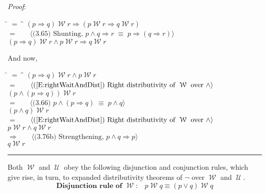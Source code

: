 \documentclass[12pt, fleqn, leqno]{article}
\newcommand{\lgap}{2pt}                             %
\newcommand{\mymathindent}{24pt}                    %
\newcommand{\equivs}{\ensuremath{\;\equiv\;}}       %
\newcommand{\impl}{\ensuremath{\Rightarrow}}        %
\newcommand{\Until}{\;\mathcal{U}\;}
\newcommand{\Wait}{\;\mathcal{W}\;}
\newcommand{\myqed}{\rule[-.23ex]{1.2ex}{2.0ex}}
\newcommand{\myqedtab}{\hspace{384pt}}              %
\newcommand{\Gll} {\langle}                         %
\newcommand{\Ggg} {\rangle}                         %
\newcommand{\Hint}[1]     {\ \ \ $\Gll              \mbox{#1} \Ggg$ }   %
\begin{document}
\emph{Proof}:
\begin{tabbing}
\hspace{\mymathindent} \= $= \;$ \= \myqedtab \= \kill
  \> \>   $(p \impl q) \Wait r\impl (p \Wait r \impl q \Wait r)$\\[\lgap]
  \> $=$  \>  \Hint{(3.65) Shunting, $p\land q\impl r\equivs p\impl (q\impl r)$}\\[\lgap]
  \> \>   $(p \impl q) \Wait r\land p \Wait r \impl q \Wait r$
\end{tabbing}
And now,
\begin{tabbing}
\hspace{\mymathindent} \= $= \;$ \= \myqedtab \= \kill
  \> \>   $(p \impl q) \Wait r\land p \Wait r$\\[\lgap]
  \> $=$ \> \Hint{(\ref{E:rightWaitAndDist}) Right distributivity of $\Wait$ over $\land$} \\[\lgap]
  \> \>   $(p\land (p\impl q)) \Wait r$\\[\lgap]
  \> $=$  \>  \Hint{(3.66) $p\land (p \impl q) \equivs  p \land q$}\\[\lgap]
  \> \>   $(p\land q) \Wait r$\\[\lgap]
  \> $=$ \> \Hint{(\ref{E:rightWaitAndDist}) Right distributivity of $\Wait$ over $\land$} \\[\lgap]
  \> \>   $p\Wait r\land q\Wait r$\\[\lgap]
  \> $\impl$ \> \Hint{(3.76b) Strengthening, $p\land q \impl p$} \\[\lgap]
  \> \>   $q\Wait r$ \quad \myqed
\end{tabbing}

Both $\Wait$ and $\Until$ obey the following disjunction and conjunction rules, which give rise, in turn, to expanded distributivity theorems of $\neg$ over $\Wait$ and $\Until$.
\begin{equation}\label{E:disRuleWait}
\textbf{Disjunction rule of $\Wait$:}\quad p\Wait q\equiv (p\lor q)\Wait q
\end{equation}
\end{document}
